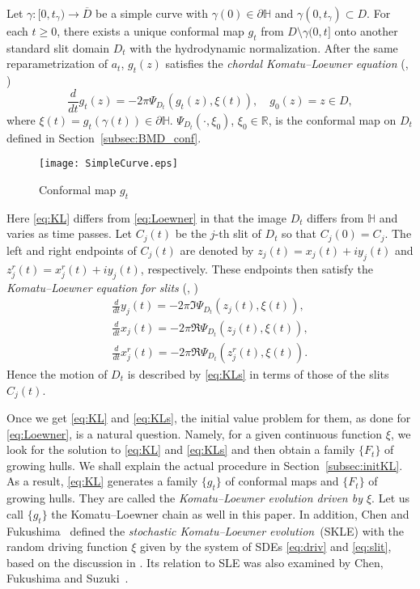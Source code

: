 \documentclass[preprint,12pt]{elsarticle}
\theoremstyle{definition}
\newcommand{\R}{\mathbb{R}}
\newcommand{\uhp}{\mathbb{H}}
\begin{document}
Let $\gamma \colon [0, t_{\gamma}) \to \overline{D}$ be a simple curve
with $\gamma(0) \in \partial \uhp$ and $\gamma(0, t_{\gamma}) \subset D$.
For each $t \geq 0$, there exists a unique conformal map $g_t$
from $D \setminus \gamma(0,t]$ onto another standard slit domain $D_t$
with the hydrodynamic normalization.
After the same reparametrization of $a_t$,
$g_t(z)$ satisfies the \emph{chordal Komatu--Loewner equation}
(\cite[Theorem~3.1]{BF08}, \cite[Theorem~9.9]{CFR16})
\begin{equation} \label{eq:KL}
\frac{d}{dt}g_{t}(z) = -2\pi \Psi_{D_t}(g_{t}(z),\xi(t)), \quad g_{0}(z)=z \in D,
\end{equation}
where $\xi(t)=g_t(\gamma(t)) \in \partial \uhp$.
$\Psi_{D_t}(\cdot, \xi_0)$, $\xi_0 \in \R$, is the conformal map on $D_t$
defined in Section~\ref{subsec:BMD_conf}.

\begin{figure}
\centering
\texttt{[image: SimpleCurve.eps]}
\caption{Conformal map $g_t$}
\end{figure}

Here \eqref{eq:KL} differs from \eqref{eq:Loewner} in that
the image $D_t$ differs from $\uhp$ and varies as time passes.
Let $C_j(t)$ be the $j$-th slit of $D_t$ so that $C_j(0)=C_j$.
The left and right endpoints of $C_j(t)$ are denoted by $z_j(t)=x_j(t)+iy_j(t)$
and $z^r_j(t)=x^r_j(t)+iy_j(t)$, respectively.
These endpoints then satisfy the \emph{Komatu--Loewner equation for slits}
(\cite[Theorem~4.1]{BF08}, \cite[Theorem~2.3]{CF18})
\begin{equation} \label{eq:KLs}
\begin{split}
\frac{d}{dt}y_{j}(t) = -2\pi \Im \Psi_{D_t}(z_{j}(t),\xi(t)), \\
\frac{d}{dt}x_{j}(t) = -2\pi \Re \Psi_{D_t}(z_{j}(t),\xi(t)), \\
\frac{d}{dt}x^{r}_{j}(t) = -2\pi \Re \Psi_{D_t}(z^{r}_{j}(t),\xi(t)).
\end{split}
\end{equation}
Hence the motion of $D_t$ is described by \eqref{eq:KLs}
in terms of those of the slits $C_j(t)$.

Once we get \eqref{eq:KL} and \eqref{eq:KLs},
the initial value problem for them, as done for \eqref{eq:Loewner},
is a natural question.
Namely, for a given continuous function $\xi$,
we look for the solution to \eqref{eq:KL} and \eqref{eq:KLs}
and then obtain a family $\{F_t\}$ of growing hulls.
We shall explain the actual procedure in Section~\ref{subsec:initKL}.
As a result, \eqref{eq:KL} generates a family $\{g_t\}$
of conformal maps and $\{F_t\}$ of growing hulls.
They are called the \emph{Komatu--Loewner evolution
driven by $\xi$}.
Let us call $\{g_t\}$ the Komatu--Loewner chain as well in this paper.
In addition, Chen and Fukushima~\cite{CF18} defined
the \emph{stochastic Komatu--Loewner evolution}~(SKLE)
with the random driving function $\xi$ given by the system of SDEs
\eqref{eq:driv} and \eqref{eq:slit},
based on the discussion in \cite[Section~5]{BF08}.
Its relation to SLE was also examined by Chen, Fukushima and Suzuki~\cite{CFS17}.
\end{document}
